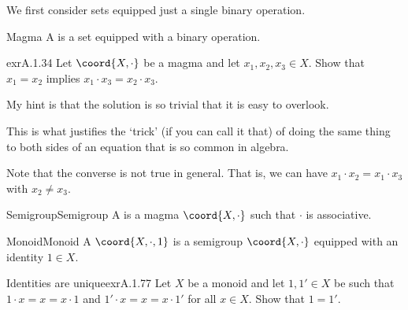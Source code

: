 We first consider sets equipped just a single binary operation.
\begin{dfn}{Magma}{}
A  is a set equipped with a binary operation.
\end{dfn}
\begin{exr}{}{exrA.1.34}
Let $\coord{X,\cdot }$ be a magma and let $x_1,x_2,x_3\in X$.  Show that $x_1=x_2$ implies $x_1\cdot x_3=x_2\cdot x_3$.
\begin{rmk}
My hint is that the solution is so trivial that it is easy to overlook.
\end{rmk}
\begin{rmk}
This is what justifies the `trick' (if you can call it that) of doing the same thing to both sides of an equation that is so common in algebra.
\end{rmk}
\begin{rmk}
Note that the converse is not true in general.  That is, we can have $x_1\cdot x_2=x_1\cdot x_3$ with $x_2\neq x_3$.
\end{rmk}
\end{exr}
\begin{dfn}{Semigroup}{Semigroup}
A  is a magma $\coord{X,\cdot}$ such that $\cdot$ is associative.
\end{dfn}
\begin{dfn}{Monoid}{Monoid}
A  $\coord{X,\cdot ,1}$ is a semigroup $\coord{X,\cdot}$ equipped with an identity $1\in X$.
\end{dfn}
\begin{exr}{Identities are unique}{exrA.1.77}
Let $X$ be a monoid and let $1,1'\in X$ be such that $1\cdot x=x=x\cdot 1$ and $1'\cdot x=x=x\cdot 1'$ for all $x\in X$.  Show that $1=1'$.
\end{exr}
